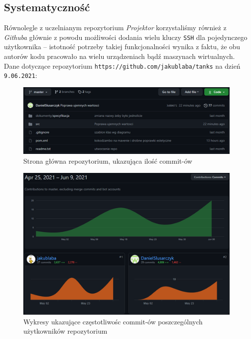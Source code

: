 \documentclass[11pt,a4paper]{report}
\begin{document}
\subsection {Systematyczność}
Równolegle z uczelnianym repozytorium \textsl{Projektor} korzystaliśmy również z \textsl{Githuba} głównie z powodu możliwości dodania wielu kluczy \texttt{SSH} dla pojedynczego użytkownika -- istotność potrzeby takiej funkcjonalności wynika z faktu, że obu autorów kodu pracowało na wielu urządzeniach bądź maszynach wirtualnych.\\ Dane dotyczące repozytorium \texttt{https://github.com/jakublaba/tanks} na dzień \texttt{9.06.2021}:\\
\begin{figure}[ht!]
\centerline{\includegraphics{img/repo.png}}
\caption{Strona główna repozytorium, ukazująca ilość commit-ów}
\end{figure}
\newpage
\begin{figure}[ht!]
\centerline{\includegraphics{img/contributors.png}}
\caption{Wykresy ukazujące częstotliwośc commit-ów poszczególnych użytkowników repozytorium}
\end{figure}
\newpage
\end{document}
